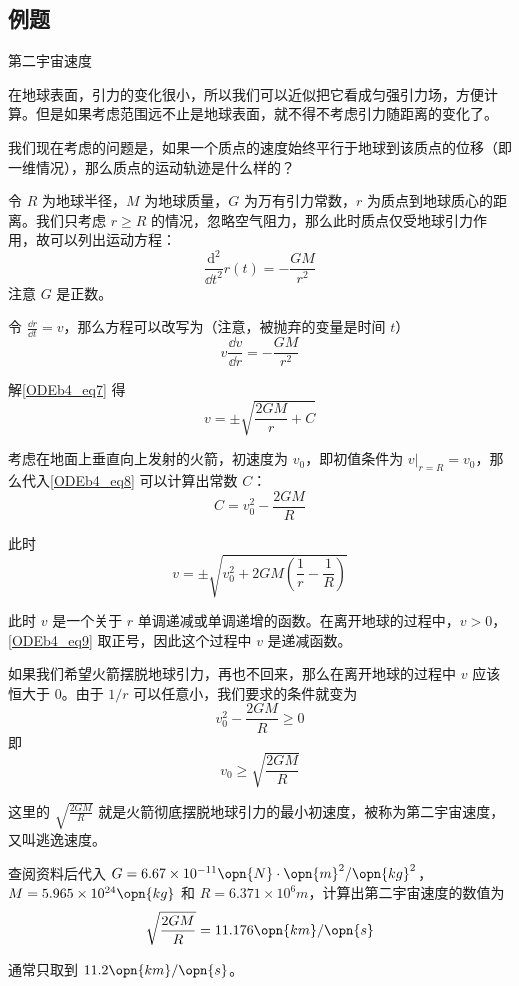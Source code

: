 \subsection{例题}

\begin{example}{第二宇宙速度}

在地球表面，引力的变化很小，所以我们可以近似把它看成匀强引力场，方便计算。但是如果考虑范围远不止是地球表面，就不得不考虑引力随距离的变化了。

我们现在考虑的问题是，如果一个质点的速度始终平行于地球到该质点的位移（即一维情况），那么质点的运动轨迹是什么样的？

令 $R$ 为地球半径，$M$ 为地球质量，$G$ 为万有引力常数，$r$ 为质点到地球质心的距离。我们只考虑 $r\geq R$ 的情况，忽略空气阻力，那么此时质点仅受地球引力作用，故可以列出运动方程：
\begin{equation}
\frac{\mathrm{d}^2}{\dd t^2}r(t)=-\frac{GM}{r^2}
\end{equation}
注意 $G$ 是正数。

令 $\frac{\dd r}{\dd t}=v$，那么方程可以改写为（注意，被抛弃的变量是时间 $t$）
\begin{equation}\label{ODEb4_eq7}
v\frac{\dd v}{\dd r}=-\frac{GM}{r^2}
\end{equation}

解\autoref{ODEb4_eq7} 得
\begin{equation}\label{ODEb4_eq8}
v=\pm\sqrt{\frac{2GM}{r}+C}
\end{equation}

考虑在地面上垂直向上发射的火箭，初速度为 $v_0$，即初值条件为 $v|_{r=R}=v_0$，那么代入\autoref{ODEb4_eq8} 可以计算出常数 $C$：
\begin{equation}
C=v_0^2-\frac{2GM}{R}
\end{equation}

此时
\begin{equation}\label{ODEb4_eq9}
v=\pm\sqrt{v_0^2+2GM(\frac{1}{r}-\frac{1}{R})}
\end{equation}

此时 $v$ 是一个关于 $r$ 单调递减或单调递增的函数。在离开地球的过程中，$v>0$，\autoref{ODEb4_eq9} 取正号，因此这个过程中 $v$ 是递减函数。

如果我们希望火箭摆脱地球引力，再也不回来，那么在离开地球的过程中 $v$ 应该恒大于 $0$。由于 $1/r$ 可以任意小，我们要求的条件就变为
\begin{equation}
v_0^2-\frac{2GM}{R}\geq 0
\end{equation}
即
\begin{equation}
v_0\geq\sqrt{\frac{2GM}{R}}
\end{equation}

这里的 $\sqrt{\frac{2GM}{R}}$ 就是火箭彻底摆脱地球引力的最小初速度，被称为第二宇宙速度，又叫逃逸速度。

查阅资料后代入 $G=6.67\times10^{-11} \opn{N}\cdot\opn{m}^2/\opn{kg}^2$，$M=5.965\times10^{24}\opn{kg}$ 和 $R=6.371\times10^{6}m$，计算出第二宇宙速度的数值为
\begin{equation}
\sqrt{\frac{2GM}{R}}=11.176\opn{km}/\opn{s}
\end{equation}

通常只取到 $11.2\opn{km}/\opn{s}$。

\end{example}

















